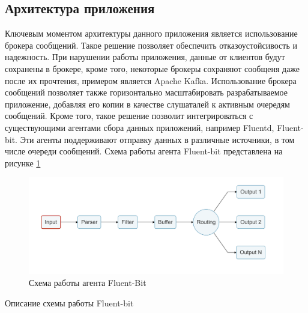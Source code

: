 \documentclass[14pt, russian]{scrartcl}
\begin{document}
\subsection{Архитектура приложения}

Ключевым моментом архитектуры данного приложения
является использование брокера сообщений. Такое решение
позволяет обеспечить отказоустойсивость и надежность.
При нарушении работы приложения, данные от клиентов будут сохранены в брокере,
кроме того, некоторые брокеры сохраняют сообщеня даже после их прочтения,
примером является Apache Kafka. Использование брокера
сообщений позволяет также горизонтально масштабировать
разрабатываемое приложение, добавляя его копии в качестве
слушаталей к активным очередям сообщений. Кроме того,
такое решение позволит интегрироваться с существующими
агентами сбора данных приложений, например  Fluentd, Fluent-bit.
Эти агенты поддерживают отправку данных в различные источники, в том
числе очереди сообщений. Схема работы агента Fluent-bit представлена на
рисунке \ref{fig:fluentbitscheme}

\begin{figure}[H]
	\centering
	\begin{minipage}[t]{.9\textwidth}
		\centering
		\includegraphics[width=.7\textwidth]{./imgs/fluentbit.png}
	\end{minipage}
	\caption{Схема работы агента Fluent-Bit}
	\label{fig:fluentbitscheme}
\end{figure}

Описание схемы работы Fluent-bit
\end{document}
